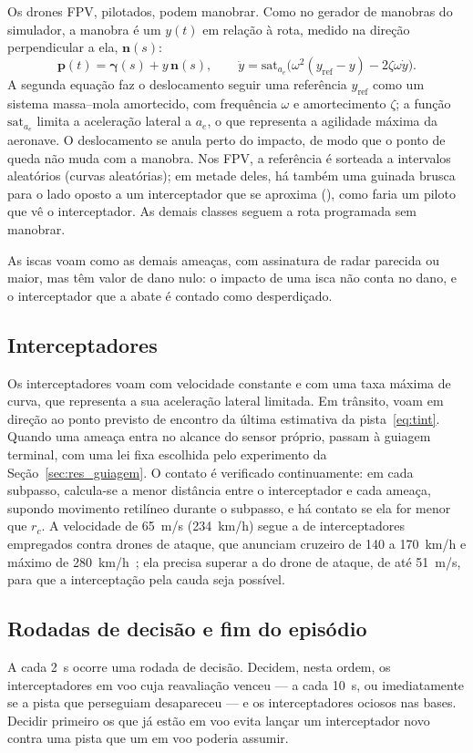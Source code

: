 Os drones FPV, pilotados, podem manobrar. Como no gerador de manobras do simulador, a manobra é um
 $y(t)$ em relação à rota, medido na direção perpendicular a ela, $\bm{n}(s)$:
\begin{equation}
  \bm{p}(t)=\bm{\gamma}(s)+y\,\bm{n}(s),\qquad
  \ddot y = \mathrm{sat}_{a_e}\!\big(\omega^2(y_{\mathrm{ref}}-y)-2\zeta\omega\dot y\big).
  \label{eq:evasao}
\end{equation}
A segunda equação faz o deslocamento seguir uma referência $y_{\mathrm{ref}}$ como um sistema massa--mola amortecido, com
frequência $\omega$ e amortecimento $\zeta$; a função $\mathrm{sat}_{a_e}$ limita a aceleração lateral a $a_e$, o que
representa a agilidade máxima da aeronave. O deslocamento se anula perto do impacto, de modo que o ponto de queda não muda
com a manobra. Nos FPV, a referência é sorteada a intervalos aleatórios (curvas aleatórias); em metade deles, há também
uma guinada brusca para o lado oposto a um interceptador que se aproxima (), como faria um
piloto que vê o interceptador. As demais classes seguem a rota programada sem manobrar.

As iscas voam como as demais ameaças, com assinatura de radar parecida ou maior, mas têm valor de dano nulo: o impacto
de uma isca não conta no dano, e o interceptador que a abate é contado como desperdiçado.

\subsection{Interceptadores}
Os interceptadores voam com velocidade constante e com uma taxa máxima de curva, que representa a sua aceleração lateral
limitada. Em trânsito, voam em direção ao ponto previsto de encontro da última estimativa da pista~\eqref{eq:tint}. Quando
uma ameaça entra no alcance do sensor próprio, passam à guiagem terminal, com uma lei fixa escolhida pelo experimento da
Seção~\ref{sec:res_guiagem}. O contato é verificado continuamente: em cada subpasso, calcula-se a menor distância entre o
interceptador e cada ameaça, supondo movimento retilíneo durante o subpasso, e há contato se ela for menor que $r_c$. A
velocidade de 65~m/s (234~km/h) segue a de interceptadores empregados contra drones de ataque, que anunciam cruzeiro de
140 a 170~km/h e máximo de 280~km/h~\cite{whSting,uaSting}; ela precisa superar a do drone de ataque, de até 51~m/s,
para que a interceptação pela cauda seja possível.

\subsection{Rodadas de decisão e fim do episódio}
A cada 2~s ocorre uma rodada de decisão. Decidem, nesta ordem, os interceptadores em voo cuja reavaliação venceu --- a
cada 10~s, ou imediatamente se a pista que perseguiam desapareceu --- e os interceptadores ociosos nas bases. Decidir
primeiro os que já estão em voo evita lançar um interceptador novo contra uma pista que um em voo poderia assumir.

